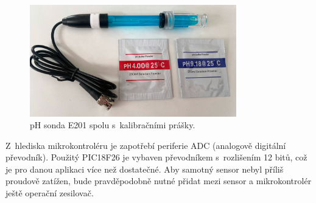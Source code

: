 \begin{figure}[h!]
    \centering
    \includegraphics[width=0.8\textwidth]{obrazky/foto/ph_sonda.jpeg}
    \caption{pH sonda E201 spolu s~kalibračními prášky.}
    \label{fig:obrazky-foto-ph_sonda-jpeg}
\end{figure}

Z~hlediska mikrokontroléru je zapotřebí periferie ADC (analogově digitální převodník). Použitý PIC18F26 je vybaven převodníkem s~rozlišením  12 bitů, což je pro danou aplikaci více než dostatečné. Aby samotný sensor nebyl příliš proudově zatížen, bude pravděpodobně nutné přidat mezi sensor a mikrokontrolér ještě operační zesilovač. 




